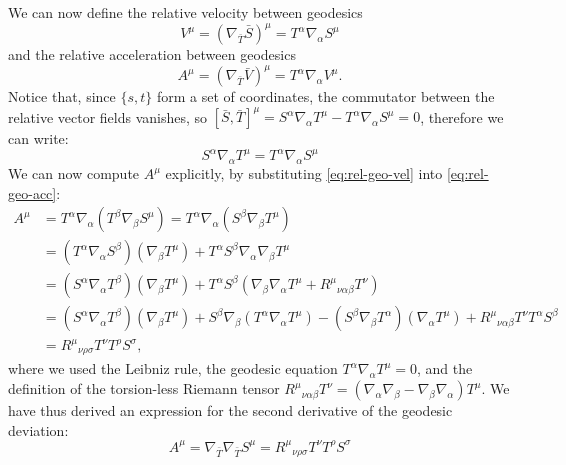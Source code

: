 \documentclass[a4paper]{article}
\begin{document}
We can now define the relative velocity between geodesics
\begin{equation}
  V^{\mu} = (\nabla_{\bar{T}}\bar{S})^{\mu} = T^{\alpha}\nabla_{\alpha}S^{\mu}
  \label{eq:rel-geo-vel}
\end{equation}
and the relative acceleration between geodesics
\begin{equation}
  A^{\mu} = (\nabla_{\bar{T}}\bar{V})^{\mu} = T^{\alpha}\nabla_{\alpha}V^{\mu}.
  \label{eq:rel-geo-acc}
\end{equation}
Notice that, since $\{s,t\}$ form a set of coordinates, the commutator between the relative vector fields vanishes, so $[\bar{S}, \bar{T}]^{\mu} = S^{\alpha}\nabla_{\alpha}T^{\mu} - T^{\alpha}\nabla_{\alpha}S^{\mu} = 0$, therefore we can write:
\begin{equation}
  S^{\alpha}\nabla_{\alpha}T^{\mu} = T^{\alpha}\nabla_{\alpha}S^{\mu}
  \label{eq:vanishing-commutator}
\end{equation}
We can now compute $A^{\mu}$ explicitly, by substituting \eqref{eq:rel-geo-vel} into \eqref{eq:rel-geo-acc}:
\begin{align*}
  A^{\mu} &= T^{\alpha}\nabla_{\alpha}(T^{\beta}\nabla_{\beta}S^{\mu}) = T^{\alpha}\nabla_{\alpha}(S^{\beta}\nabla_{\beta}T^{\mu})\\
  &=(T^{\alpha}\nabla_{\alpha}S^{\beta})(\nabla_{\beta}T^{\mu}) + T^{\alpha} S^{\beta}\nabla_{\alpha}\nabla_{\beta}T^{\mu}\\
  &=(S^{\alpha}\nabla_{\alpha}T^{\beta})(\nabla_{\beta}T^{\mu}) + T^{\alpha}S^{\beta}(\nabla_{\beta}\nabla_{\alpha}T^{\mu} + {R^{\mu}}_{\nu\alpha\beta}T^{\nu})\\
  &=(S^{\alpha}\nabla_{\alpha}T^{\beta})(\nabla_{\beta}T^{\mu}) + S^{\beta}\nabla_{\beta}(T^{\alpha}\nabla_{\alpha}T^{\mu}) - (S^{\beta}\nabla_{\beta}T^{\alpha})(\nabla_{\alpha}T^{\mu}) + {R^{\mu}}_{\nu\alpha\beta}T^{\nu}T^{\alpha}S^{\beta}\\
  &= {R^{\mu}}_{\nu\rho\sigma} T^{\nu}T^{\rho}S^{\sigma},
\end{align*}
where we used the Leibniz rule, the geodesic equation $T^{\alpha}\nabla_{\alpha}T^{\mu} = 0$, and the definition of the torsion-less Riemann tensor ${R^{\mu}}_{\nu\alpha\beta}T^{\nu} = (\nabla_{\alpha}\nabla_{\beta}-\nabla_{\beta}\nabla_{\alpha})T^{\mu}$.
We have thus derived an expression for the second derivative of the geodesic deviation:
\begin{equation}
  A^{\mu} = \nabla_{\bar{T}}\nabla_{\bar{T}} S^{\mu} = {R^{\mu}}_{\nu\rho\sigma} T^{\nu}T^{\rho}S^{\sigma}
  \label{eq:geodesic-deviation}
\end{equation}
\end{document}
